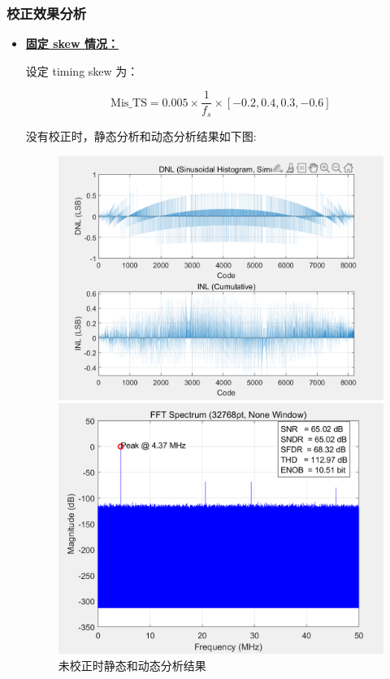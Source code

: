 \documentclass[cs4size,a4paper]{ctexart}
\numberwithin{equation}{section}
\numberwithin{table}{section}
\numberwithin{figure}{section}
\begin{document}
		\subsubsection{校正效果分析}
		\begin{itemize}
			\item 
		\textbf{\underline{固定 skew 情况：}}
		
		设定 timing skew 为：
		
		\[
		\text{Mis\_TS} = 0.005 \times \frac{1}{f_s} \times [-0.2, 0.4, 0.3, -0.6]
		\]
		
		没有校正时，静态分析和动态分析结果如下图:
		\begin{figure}[H]
			\centering
			\begin{minipage}{0.49\linewidth}
				\centering
				\includegraphics[width=0.9\linewidth]{figure/result1.png}
			\end{minipage}
			\begin{minipage}{0.49\linewidth}
				\centering
				\includegraphics[width=0.9\linewidth]{figure/result2.png}
			\end{minipage}
			\caption{未校正时静态和动态分析结果} 
			\label{fig:result12}
		\end{figure}
		

\end{itemize}
\end{document}
